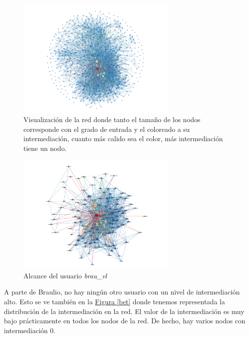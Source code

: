 \documentclass[10pt,a4paper,spanish]{article}
\numberwithin{equation}{section} %
\numberwithin{figure}{section} %
\numberwithin{table}{section} %
\begin{document}
\begin{figure}[!h]
    \centering
    \includegraphics[width=0.7\textwidth]{medidas_locales/intermediacion}
    \caption{Visualización de la red donde tanto el tamaño de los nodos corresponde con el grado de entrada y el coloreado a su intermediación, cuanto más calido sea el color, más intermediación tiene un nodo.}
    \label{intermediacion}
\end{figure}

\begin{figure}[!h]
    \centering
    \includegraphics[width=0.7\textwidth]{medidas_locales/intermediacionbrau}
    \caption{Alcance del usuario \textit{brau\_vl}}
    \label{intermediacionbrau}
\end{figure}

A parte de Braulio, no hay ningún otro usuario con un nivel de intermediación alto. Esto se ve también en la \hyperref[bet]{Figura \ref*{bet}} donde tenemos representada la distribución de la intermediación en la red. El valor de la intermediación es muy bajo prácticamente en todos los nodos de la red. De hecho, hay varios nodos con intermediación 0.
\end{document}

